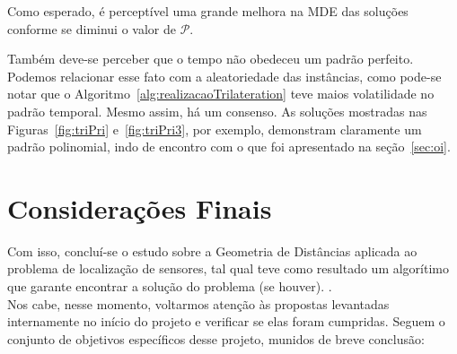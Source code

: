 \documentclass[a4paper,12pt]{article}
\begin{document}
	Como esperado, é perceptível uma grande melhora na MDE das soluções conforme se diminui o valor de $\mathcal{P}$. 
	
	Também deve-se perceber que o tempo não obedeceu um padrão perfeito. Podemos relacionar esse fato com a aleatoriedade das instâncias, como pode-se notar que o Algoritmo~\ref{alg:realizacaoTrilateration} teve maios volatilidade no padrão temporal. Mesmo assim, há um consenso. As soluções mostradas nas Figuras~\ref{fig:triPri} e~\ref{fig:triPri3}, por exemplo, demonstram claramente um padrão polinomial, indo de encontro com o que foi apresentado na seção~\ref{sec:oi}.
	
	\newpage
	\section{Considerações Finais}
	Com isso, concluí-se o estudo sobre a Geometria de Distâncias aplicada ao problema de localização de sensores, tal qual teve como resultado um algorítimo que garante encontrar a solução do problema (se houver). .
	\\
	
	Nos cabe, nesse momento, voltarmos atenção às propostas levantadas internamente no início do projeto e verificar se elas foram cumpridas. Seguem o conjunto de objetivos específicos desse projeto, munidos de breve conclusão:
	
\end{document}
